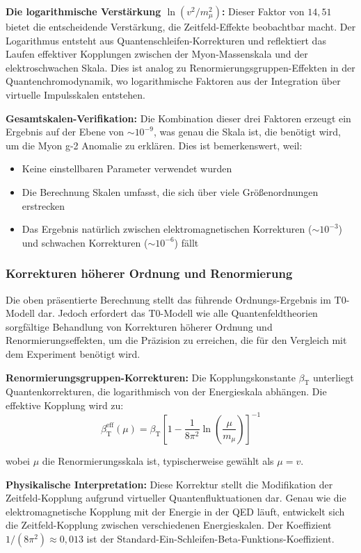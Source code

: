 \documentclass[12pt,a4paper]{article}
\newcommand{\betaT}{\beta_{\text{T}}}
\begin{document}
	\textbf{Die logarithmische Verstärkung $\ln(v^2/m_{\mu}^2)$:}
	Dieser Faktor von $14{,}51$ bietet die entscheidende Verstärkung, die Zeitfeld-Effekte beobachtbar macht. Der Logarithmus entsteht aus Quantenschleifen-Korrekturen und reflektiert das Laufen effektiver Kopplungen zwischen der Myon-Massenskala und der elektroschwachen Skala. Dies ist analog zu Renormierungsgruppen-Effekten in der Quantenchromodynamik, wo logarithmische Faktoren aus der Integration über virtuelle Impulsskalen entstehen.
	
	\textbf{Gesamtskalen-Verifikation:}
	Die Kombination dieser drei Faktoren erzeugt ein Ergebnis auf der Ebene von $\sim 10^{-9}$, was genau die Skala ist, die benötigt wird, um die Myon g-2 Anomalie zu erklären. Dies ist bemerkenswert, weil:
	\begin{itemize}
		\item Keine einstellbaren Parameter verwendet wurden
		\item Die Berechnung Skalen umfasst, die sich über viele Größenordnungen erstrecken
		\item Das Ergebnis natürlich zwischen elektromagnetischen Korrekturen ($\sim 10^{-3}$) und schwachen Korrekturen ($\sim 10^{-6}$) fällt
	\end{itemize}
	
	\subsubsection{Korrekturen höherer Ordnung und Renormierung}
	
	Die oben präsentierte Berechnung stellt das führende Ordnungs-Ergebnis im T0-Modell dar. Jedoch erfordert das T0-Modell wie alle Quantenfeldtheorien sorgfältige Behandlung von Korrekturen höherer Ordnung und Renormierungseffekten, um die Präzision zu erreichen, die für den Vergleich mit dem Experiment benötigt wird.
	
	\textbf{Renormierungsgruppen-Korrekturen:}
	Die Kopplungskonstante $\betaT$ unterliegt Quantenkorrekturen, die logarithmisch von der Energieskala abhängen. Die effektive Kopplung wird zu:
	\begin{equation}
		\betaT^{\text{eff}}(\mu) = \betaT \left[1 - \frac{1}{8\pi^2} \ln\left(\frac{\mu}{m_{\mu}}\right)\right]^{-1}
	\end{equation}
	
	wobei $\mu$ die Renormierungsskala ist, typischerweise gewählt als $\mu = v$.
	
	\textbf{Physikalische Interpretation:} Diese Korrektur stellt die Modifikation der Zeitfeld-Kopplung aufgrund virtueller Quantenfluktuationen dar. Genau wie die elektromagnetische Kopplung mit der Energie in der QED läuft, entwickelt sich die Zeitfeld-Kopplung zwischen verschiedenen Energieskalen. Der Koeffizient $1/(8\pi^2) \approx 0{,}013$ ist der Standard-Ein-Schleifen-Beta-Funktions-Koeffizient.
	
\end{document}
